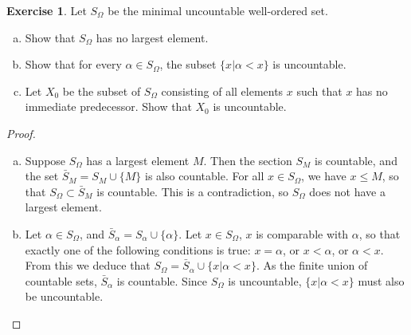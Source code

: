\documentclass[11pt,a4paper,twoside]{article}
\theoremstyle{definition}
\newcounter{excounter}
\newtheorem{exercise}[excounter]{Exercise}
\begin{document}
\begin{exercise}

  Let $S_\Omega$ be the minimal uncountable well-ordered set.
  \begin{enumerate}[(a)]
  \item Show that $S_\Omega$ has no largest element.
  \item Show that for every $\alpha \in S_\Omega$, the subset $\{ x | \alpha < x \}$ is uncountable.
  \item Let $X_0$ be the subset of $S_\Omega$ consisting of all elements $x$ such that $x$ has no immediate predecessor.
    Show that $X_0$ is uncountable.
  \end{enumerate}

\end{exercise}

\begin{proof}\hfill

  \begin{enumerate}[(a)]

  \item Suppose $S_\Omega$ has a largest element $M$. Then the section $S_M$ is countable, and
    the set $\bar{S}_M = S_M \cup \{ M \}$ is also countable. For all $x \in S_\Omega$, we have $x \leq M$,
    so that $S_\Omega \subset \bar{S}_M$ is countable. This is a contradiction, so $S_\Omega$ does not have a largest element.

  \item Let $\alpha \in S_\Omega$, and $\bar{S}_\alpha = S_\alpha \cup \{ \alpha \}$. Let $x \in S_\Omega$, $x$ is comparable with $\alpha$,
    so that exactly one of the following conditions is true: $x = \alpha$, or $x < \alpha$, or $\alpha < x$. From this we deduce that
    $S_\Omega = \bar{S}_\alpha \cup \{ x | \alpha < x \}$. As the finite union of countable sets, $\bar{S}_\alpha$ is countable.
    Since $S_\Omega$ is uncountable, $\{ x | \alpha < x \}$ must also be uncountable.


\end{enumerate}
\end{proof}
\end{document}
